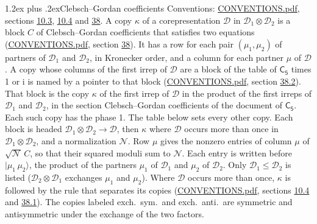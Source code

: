 \documentclass[10pt,a4paper]{article}
\makeatletter
\renewcommand\section{\@startsection{section}{1}{\z@}{-3ex plus -1ex minus -.2ex}%
  {1.2ex plus .2ex}{\normalfont\large\sffamily\bfseries\color{parttitle}}}
\numberwithin{equation}{section}
\newcommand{\grp}[1]{\mathsf{#1}}
\newcommand{\iunit}{\mathrm{i}}
\newcommand{\irrprod}{\otimes}
\newcommand{\mult}{\kappa}
\newcommand{\intx}{\mu}
\newcommand{\cgnorm}{\mathcal{N}}
\newcommand{\prodket}[2]{\lvert {#1}\,{#2}\rangle}
\makeatother
\begin{document}
\section{Clebsch--Gordan coefficients}\label{s:clebsch_gordan}
Conventions: \href{../../CONVENTIONS.pdf}{CONVENTIONS.pdf}, sections \href{../../../rotation/CONVENTIONS.pdf\#conv.10.3}{10.3}, \href{../../../rotation/CONVENTIONS.pdf\#conv.10.4}{10.4} and \href{../../CONVENTIONS.pdf\#conv.38}{38}.
\leavevmode\label{n:index.copy}\label{n:matrix.cg.stored}A copy $\mult$ of a corepresentation $\mathcal{D}$ in $\mathcal{D}_1\irrprod\mathcal{D}_2$ is a block $C$ of Clebsch--Gordan coefficients that satisfies two equations (\href{../../CONVENTIONS.pdf}{CONVENTIONS.pdf}, section \href{../../CONVENTIONS.pdf\#conv.38}{38}). \label{n:index.cg}It has a row for each pair $(\intx_1, \intx_2)$ of partners of $\mathcal{D}_1$ and $\mathcal{D}_2$, in Kronecker order, and a column for each partner $\intx$ of $\mathcal{D}$.
A copy whose columns of the first irrep of $\mathcal{D}$ are a block of the table of $\grp{C_{5}}$ times 1 or $\iunit$ is named by a pointer to that block (\href{../../CONVENTIONS.pdf}{CONVENTIONS.pdf}, section \href{../../CONVENTIONS.pdf\#conv.38.2}{38.2}). That block is the copy $\mult$ of the first irrep of $\mathcal{D}$ in the product of the first irreps of $\mathcal{D}_1$ and $\mathcal{D}_2$, in the section Clebsch--Gordan coefficients of the document of \href{../../../rotation/data/pdf/C5.pdf}{$\grp{C_{5}}$}. Each such copy has the phase 1. The table below sets every other copy.
Each block is headed $\mathcal{D}_1\irrprod\mathcal{D}_2\to\mathcal{D}$, then $\mult$ where $\mathcal{D}$ occurs more than once in $\mathcal{D}_1\irrprod\mathcal{D}_2$, and a normalization $\cgnorm$. Row $\intx$ gives the nonzero entries of column $\intx$ of $\sqrt{\cgnorm}\,C$, so that their squared moduli sum to $\cgnorm$. \label{n:vector.ket.product}Each entry is written before $\prodket{\intx_1}{\intx_2}$, the product of the partners $\intx_1$ of $\mathcal{D}_1$ and $\intx_2$ of $\mathcal{D}_2$. Only $\mathcal{D}_1 \le \mathcal{D}_2$ is listed ($\mathcal{D}_2\irrprod\mathcal{D}_1$ exchanges $\intx_1$ and $\intx_2$).
Where $\mathcal{D}$ occurs more than once, $\mult$ is followed by the rule that separates its copies (\href{../../CONVENTIONS.pdf}{CONVENTIONS.pdf}, sections \href{../../../rotation/CONVENTIONS.pdf\#conv.10.4}{10.4} and \href{../../CONVENTIONS.pdf\#conv.38.1}{38.1}). \label{n:abbreviation.exchange}The copies labeled exch.\ sym.\ and exch.\ anti.\ are symmetric and antisymmetric under the exchange of the two factors.
\end{document}
